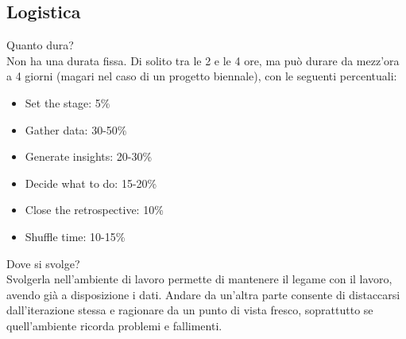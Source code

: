 \subsection{Logistica}

Quanto dura? \\

\noindent Non ha una durata fissa. Di solito tra le 2 e le 4 ore, ma può durare da mezz'ora a 4 giorni (magari nel caso di un progetto biennale), con le seguenti percentuali:

\begin{itemize}
    \item Set the stage: 5\%
    \item Gather data: 30-50\%
    \item Generate insights: 20-30\%
    \item Decide what to do: 15-20\%
    \item Close the retrospective: 10\%
    \item Shuffle time: 10-15\%
\end{itemize}
    
\noindent Dove si svolge? \\

\noindent Svolgerla nell'ambiente di lavoro permette di mantenere il legame con il lavoro, avendo già a disposizione i dati. Andare da un'altra parte consente di distaccarsi dall'iterazione stessa e ragionare da un punto di vista fresco, soprattutto se quell'ambiente ricorda problemi e fallimenti.

\begin{comment}
Non ha durata fissa. Di solito tra le 2 e 4 ore, comunque da mezz'ora a 4 giorni (retrospettiva magari di un progetto biennale). 
Dove si svolge? 
\end{comment}